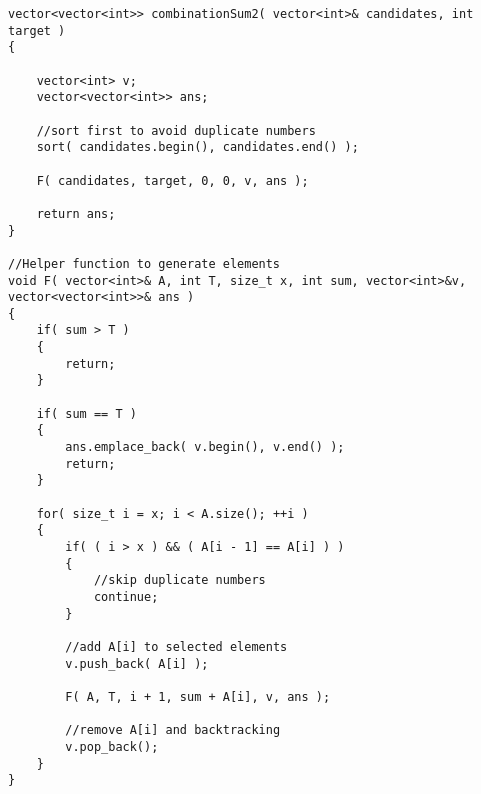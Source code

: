 \setcounter{lstlisting}{0}
\begin{lstlisting}[style=customc, caption={DFS}]
vector<vector<int>> combinationSum2( vector<int>& candidates, int target )
{

    vector<int> v;
    vector<vector<int>> ans;

    //sort first to avoid duplicate numbers
    sort( candidates.begin(), candidates.end() );

    F( candidates, target, 0, 0, v, ans );

    return ans;
}

//Helper function to generate elements
void F( vector<int>& A, int T, size_t x, int sum, vector<int>&v, vector<vector<int>>& ans )
{
    if( sum > T )
    {
        return;
    }

    if( sum == T )
    {
        ans.emplace_back( v.begin(), v.end() );
        return;
    }

    for( size_t i = x; i < A.size(); ++i )
    {
        if( ( i > x ) && ( A[i - 1] == A[i] ) )
        {
            //skip duplicate numbers
            continue;
        }

        //add A[i] to selected elements
        v.push_back( A[i] );

        F( A, T, i + 1, sum + A[i], v, ans );

        //remove A[i] and backtracking
        v.pop_back();
    }
}
\end{lstlisting}